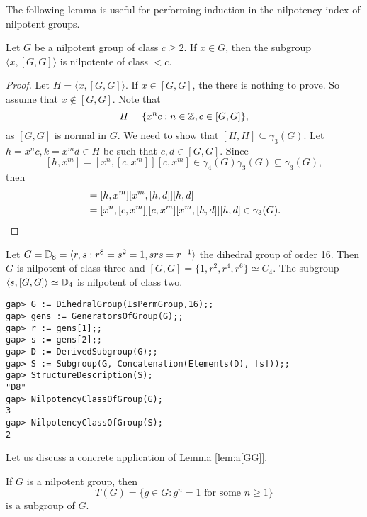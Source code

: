 The following lemma is useful for performing induction 
in the nilpotency index of nilpotent groups. 

\begin{lemma}
\label{lem:a[GG]}
Let $G$ be a nilpotent group of class $c\geq2$. If $x\in G$, then 
the subgroup 
$\langle x,[G,G]\rangle$ is nilpotente of class $<c$.
\end{lemma}

\begin{proof}
Let $H=\langle x,[G,G]\rangle$.  If $x\in [G,G]$, the there is nothing to prove. 
So assume that $x\not\in [G,G]$. Note that 
	\[
		H=\{x^nc:n\in\mathbb{Z},c\in [G,G]\},
	\]
as $[G,G]$ is normal in $G$. We need to show that
$[H,H]\subseteq\gamma_3(G)$. Let $h=x^nc,k=x^md\in H$
be such that $c,d\in [G,G]$. 
Since 
	\[
	[h,x^m]=[x^n,[c,x^m]][c,x^m]\in\gamma_4(G)\gamma_3(G)\subseteq\gamma_3(G),
	\]
then  
	\begin{align*}
		[h,k]&=[h,x^m][x^m,[h,d]][h,d]\\
			&=[x^n,[c,x^m]][c,x^m][x^m,[h,d]][h,d]\in\gamma_3(G).\qedhere
	\end{align*}
\end{proof}

\begin{example}
Let $G=\mathbb{D}_{8}=\langle r,s:r^{8}=s^2=1,srs=r^{-1}\rangle$ the dihedral group of order 16.
Then $G$ is nilpotent of class three and 
$[G,G]=\{1,r^2,r^4,r^6\}\simeq C_4$. The subgroup $\langle
s,[G,G]\rangle\simeq\mathbb{D}_4$ is nilpotent of class two. 
\begin{lstlisting}
gap> G := DihedralGroup(IsPermGroup,16);;
gap> gens := GeneratorsOfGroup(G);;
gap> r := gens[1];;
gap> s := gens[2];;
gap> D := DerivedSubgroup(G);;
gap> S := Subgroup(G, Concatenation(Elements(D), [s]));;
gap> StructureDescription(S);
"D8"
gap> NilpotencyClassOfGroup(G);
3
gap> NilpotencyClassOfGroup(S);
2
	\end{lstlisting}
\end{example}

Let us discuss a concrete application of Lemma \ref{lem:a[GG]}.

\begin{theorem}
\label{thm:T(nilpotent)}
If $G$ is a nilpotent group, then 
\[
T(G)=\{g\in G:g^n=1\text{ for some $n\geq1$}\}
\]
is a subgroup of $G$. 
\end{theorem}

